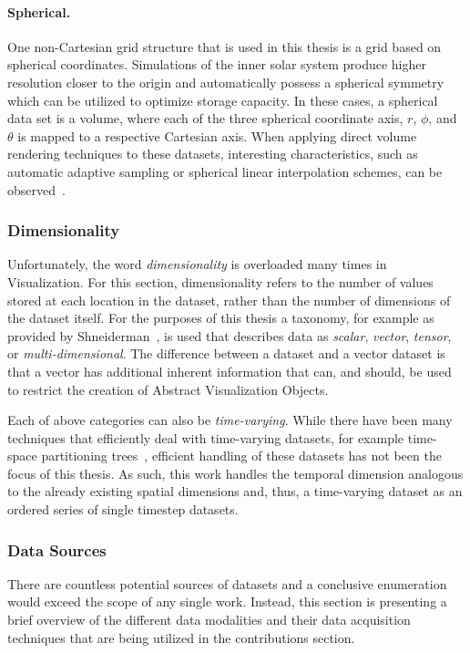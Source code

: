 \paragraph{Spherical. }  One non-Cartesian grid structure that is used in this thesis is a grid based on spherical coordinates.  Simulations of the inner solar system produce higher resolution closer to the origin and automatically possess a spherical symmetry which can be utilized to optimize storage capacity.  In these cases, a spherical data set is a  volume, where each of the three spherical coordinate axis, $r$, $\phi$, and $\theta$ is mapped to a respective Cartesian axis.  When applying direct volume rendering techniques to these datasets, interesting characteristics, such as automatic adaptive sampling or spherical linear interpolation schemes, can be observed~\cite{balabanian2007sonar}.

\subsubsection{Dimensionality} \label{cha:intro:vp:da:dimensionality}
Unfortunately, the word \emph{dimensionality} is overloaded many times in Visualization.  For this section, dimensionality refers to the number of values stored at each location in the dataset, rather than the number of dimensions of the dataset itself.  For the purposes of this thesis a taxonomy, for example as provided by Shneiderman~\cite{shneiderman1996eyes}, is used that describes data as \emph{scalar}, \emph{vector}, \emph{tensor}, or \emph{multi-dimensional}.  The difference between a  dataset and a vector dataset is that a vector has additional inherent information that can, and should, be used to restrict the creation of Abstract Visualization Objects.

Each of above categories can also be \emph{time-varying}.  While there have been many techniques that efficiently deal with time-varying datasets, for example time-space partitioning trees~\cite{shen1999fast}, efficient handling of these datasets has not been the focus of this thesis.  As such, this work handles the temporal dimension analogous to the already existing spatial dimensions and, thus, a time-varying dataset as an ordered series of single timestep datasets.

\subsubsection{Data Sources} \label{cha:intro:vp:da:sources}
There are countless potential sources of datasets and a conclusive enumeration would exceed the scope of any single work.  Instead, this section is presenting a brief overview of the different data modalities and their data acquisition techniques that are being utilized in the contributions section.


